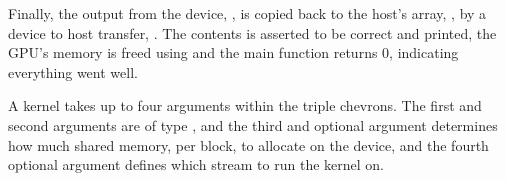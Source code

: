 Finally, the output from the device, , is copied back to the host's array, , by a device to host transfer, .
The contents is asserted to be correct and printed, the GPU's memory is freed using  and the main function returns 0, indicating everything went well.

A kernel takes up to four arguments within the triple chevrons.
The first and second arguments are of type , and the third and optional argument determines how much shared memory, per block, to allocate on the device, and the fourth optional argument defines which stream to run the kernel on.
